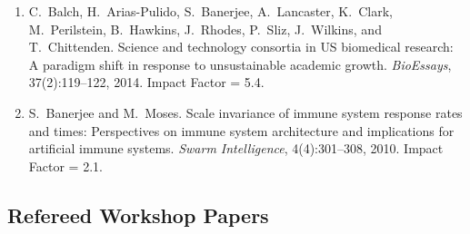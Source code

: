 \documentclass[11pt,a4paper]{article}
\begin{document}
\begin{enumerate}
  \item C.~Balch, H.~Arias-Pulido, S.~Banerjee, A.~Lancaster, K.~Clark, M.~Perilstein, B.~Hawkins, J.~Rhodes, P.~Sliz, J.~Wilkins, and T.~Chittenden. Science and technology consortia in {US} biomedical research: A paradigm shift in response to unsustainable academic growth. {\em BioEssays}, 37(2):119--122, 2014. Impact Factor = 5.4.
  \item S.~Banerjee and M.~Moses. Scale invariance of immune system response rates and times: Perspectives on immune system architecture and implications for artificial immune systems. {\em Swarm Intelligence}, 4(4):301--308, 2010. Impact Factor = 2.1.
\end{enumerate}

\subsection*{Refereed Workshop Papers}
\end{document}
